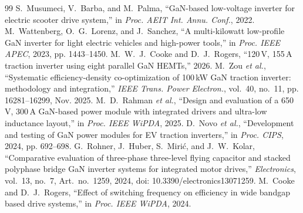\documentclass[conference]{IEEEtran}
\begin{document}
\begin{thebibliography}{99}
 S.~Musumeci, V.~Barba, and M.~Palma, ``GaN-based low-voltage inverter for electric scooter drive system,'' in \emph{Proc. AEIT Int. Annu. Conf.}, 2022.
 M.~Wattenberg, O.~G.~Lorenz, and J.~Sanchez, ``A multi-kilowatt low-profile GaN inverter for light electric vehicles and high-power tools,'' in \emph{Proc. IEEE APEC}, 2023, pp. 1443--1450.
 M.~W.~J.~Cooke and D.~J.~Rogers, ``120\,V, 155\,A traction inverter using eight parallel GaN HEMTs,'' 2026.
 M.~Zou \emph{et al.}, ``Systematic efficiency-density co-optimization of 100\,kW GaN traction inverter: methodology and integration,'' \emph{IEEE Trans. Power Electron.}, vol.~40, no.~11, pp. 16281--16299, Nov. 2025.
 M.~D.~Rahman \emph{et al.}, ``Design and evaluation of a 650\,V, 300\,A GaN-based power module with integrated drivers and ultra-low inductance layout,'' in \emph{Proc. IEEE WiPDA}, 2025.
 D.~Novo \emph{et al.}, ``Development and testing of GaN power modules for EV traction inverters,'' in \emph{Proc. CIPS}, 2024, pp. 692--698.
 G.~Rohner, J.~Huber, S.~Miri\'c, and J.~W.~Kolar, ``Comparative evaluation of three-phase three-level flying capacitor and stacked polyphase bridge GaN inverter systems for integrated motor drives,'' \emph{Electronics}, vol.~13, no.~7, Art.~no.~1259, 2024, doi: 10.3390/electronics13071259.
 M.~Cooke and D.~J.~Rogers, ``Effect of switching frequency on efficiency in wide bandgap based drive systems,'' in \emph{Proc. IEEE WiPDA}, 2024.
\end{thebibliography}
\end{document}

